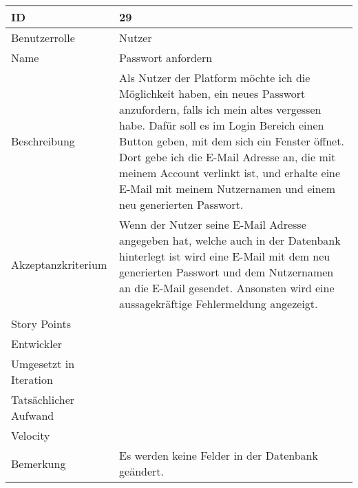 \begin{tabularx}{\textwidth}{|p{}|X|}
	\hline
	ID & 29 \\
	\hline
	Benutzerrolle & Nutzer \\
	\hline
	Name & Passwort anfordern\\
	\hline
	Beschreibung & Als Nutzer der Platform möchte ich die Möglichkeit haben, ein neues Passwort anzufordern, falls ich mein altes vergessen habe. Dafür soll es im Login Bereich einen Button geben, mit dem sich ein Fenster öffnet. Dort gebe ich die E-Mail Adresse an, die mit meinem Account verlinkt ist, und erhalte eine E-Mail mit meinem Nutzernamen und einem neu generierten Passwort. \\
	\hline
	Akzeptanzkriterium & Wenn der Nutzer seine E-Mail Adresse angegeben hat, welche auch in der Datenbank hinterlegt ist wird eine E-Mail mit dem neu generierten Passwort und dem Nutzernamen an die E-Mail gesendet. Ansonsten wird eine aussagekräftige Fehlermeldung angezeigt. \\
	\hline
	Story Points &  \\
	\hline
	Entwickler &  \\
	\hline
	Umgesetzt in Iteration & \\
	\hline
	Tatsächlicher Aufwand & \\
	\hline
	Velocity & \\
	\hline
	Bemerkung & Es werden keine Felder in der Datenbank geändert.\\
	\hline
\end{tabularx}
\vspace{20pt}
